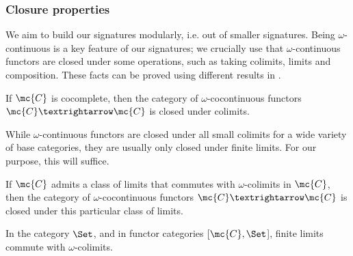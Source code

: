 \subsubsection*{Closure properties}

We aim to build our signatures modularly, i.e. out of smaller signatures.
Being $ω$-continuous is a key feature of our signatures; we crucially use that
$ω$-continuous functors are closed under some operations, such as taking
colimits, limits and composition.
These facts can be proved using different results in
\cite[Section 3.8]{CategoryTheoryInContext14}.

\begin{proposition}
  \label{prop:omega-colimits}
  If $\mc{C}$ is cocomplete, then the category of $ω$-cocontinuous
  functors $\mc{C} → \mc{C}$ is closed under colimits.
\end{proposition}

\noindent While $ω$-continuous functors are closed under all small colimits for
a wide variety of base categories, they are usually only closed under finite
limits. For our purpose, this will suffice.

\begin{proposition}
  \label{prop:omega-limits}
  If $\mc{C}$ admits a class of limits that commutes with $ω$-colimits
  in $\mc{C}$, then the category of $ω$-cocontinuous functors
  $\mc{C} → \mc{C}$ is closed under this particular class of limits.
\end{proposition}

\begin{proposition}
  \label{prop:presheaves-limits}
  In the category $\Set$, and in functor categories $[\mc{C},\Set$], finite limits commute
  with $ω$-colimits.
\end{proposition}

%
%
%
%
